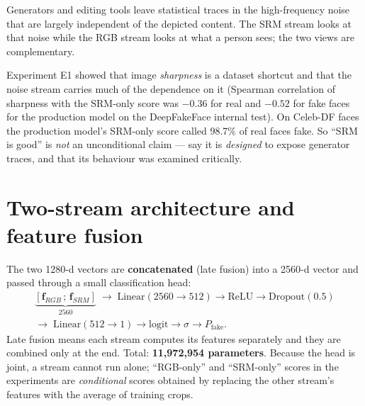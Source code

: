\documentclass[11pt,a4paper]{report}
\newcommand{\pfake}{\ensuremath{P_{\mathrm{fake}}}}
\begin{document}
\begin{keybox}
Generators and editing tools leave statistical traces in the high-frequency noise that are largely independent of the depicted content. The SRM stream looks at that noise while the RGB stream looks at what a person sees; the two views are complementary.
\end{keybox}

\begin{warnbox}
Experiment E1 showed that image \emph{sharpness} is a dataset shortcut and that the noise stream carries much of the dependence on it (Spearman correlation of sharpness with the SRM-only score was $-0.36$ for real and $-0.52$ for fake faces for the production model on the DeepFakeFace internal test).
On Celeb-DF faces the production model's SRM-only score called 98.7\% of real faces fake. So ``SRM is good'' is \emph{not} an unconditional claim --- say it is \emph{designed} to expose generator traces, and that its behaviour was examined critically.
\end{warnbox}

\section{Two-stream architecture and feature fusion}
The two 1280-d vectors are \textbf{concatenated} (late fusion) into a 2560-d vector and passed through a small classification head:
\begin{gather*}
\underbrace{[\mathbf f_{RGB}\,;\,\mathbf f_{SRM}]}_{2560}\;\rightarrow\;\mathrm{Linear}(2560\!\to\!512)\rightarrow\mathrm{ReLU}\rightarrow\mathrm{Dropout}(0.5)\\
\rightarrow\;\mathrm{Linear}(512\!\to\!1)\rightarrow\text{logit}\rightarrow\sigma\rightarrow\pfake .
\end{gather*}
Late fusion means each stream computes its features separately and they are combined only at the end. Total: \textbf{11,972,954 parameters}. Because the head is joint, a stream cannot run alone; ``RGB-only'' and ``SRM-only'' scores in the experiments are \emph{conditional} scores obtained by replacing the other stream's features with the average of training crops.
\end{document}
